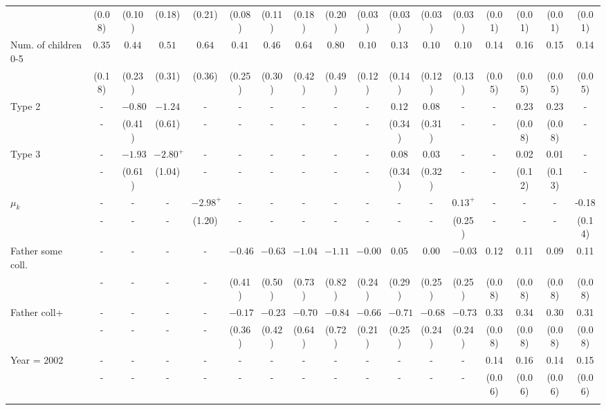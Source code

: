\begin{tabular}{lcccccccccccccccc}
&(0.08)&(0.10)&(0.18)&(0.21)&(0.08)&(0.11)&(0.18)&(0.20)&(0.03)&(0.03)&(0.03)&(0.03)&(0.01)&(0.01)&(0.01)&(0.01)\\
Num. of children 0-5&$0.35$&$0.44$&$0.51$&$0.64$&$0.41$&$0.46$&$0.64$&$0.80$&$0.10$&$0.13$&$0.10$&$0.10$&0.14&0.16&0.15&0.14\\
&(0.18)&(0.23)&(0.31)&(0.36)&(0.25)&(0.30)&(0.42)&(0.49)&(0.12)&(0.14)&(0.12)&(0.13)&(0.05)&(0.05)&(0.05)&(0.05)\\
Type 2&-&$-0.80$&$-1.24$&-&-&-&-&-&-&$0.12$&$0.08$&-&-&0.23&0.23&-\\
&-&(0.41)&(0.61)&-&-&-&-&-&-&(0.34)&(0.31)&-&-&(0.08)&(0.08)&-\\
Type 3&-&$-1.93$&$-2.80^{+}$&-&-&-&-&-&-&$0.08$&$0.03$&-&-&0.02&0.01&-\\
&-&(0.61)&(1.04)&-&-&-&-&-&-&(0.34)&(0.32)&-&-&(0.12)&(0.13)&-\\
$\mu_{k}$&-&-&-&$-2.98^{+}$&-&-&-&-&-&-&-&$0.13^{+}$&-&-&-&-0.18\\
&-&-&-&(1.20)&-&-&-&-&-&-&-&(0.25)&-&-&-&(0.14)\\
Father some coll.&-&-&-&-&$-0.46$&$-0.63$&$-1.04$&$-1.11$&$-0.00$&$0.05$&$0.00$&$-0.03$&0.12&0.11&0.09&0.11\\
&-&-&-&-&(0.41)&(0.50)&(0.73)&(0.82)&(0.24)&(0.29)&(0.25)&(0.25)&(0.08)&(0.08)&(0.08)&(0.08)\\
Father coll+&-&-&-&-&$-0.17$&$-0.23$&$-0.70$&$-0.84$&$-0.66$&$-0.71$&$-0.68$&$-0.73$&0.33&0.34&0.30&0.31\\
&-&-&-&-&(0.36)&(0.42)&(0.64)&(0.72)&(0.21)&(0.25)&(0.24)&(0.24)&(0.08)&(0.08)&(0.08)&(0.08)\\
Year = 2002&-&-&-&-&-&-&-&-&-&-&-&-&0.14&0.16&0.14&0.15\\
&-&-&-&-&-&-&-&-&-&-&-&-&(0.06)&(0.06)&(0.06)&(0.06)\\
\\
\bottomrule\end{tabular}